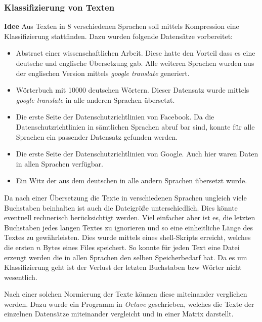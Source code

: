 \documentclass[12pt,german]{article}
\begin{document}
\subsubsection{Klassifizierung von Texten}

\textbf{Idee}
Aus Texten in 8 verschiedenen Sprachen soll mittels Kompression eine Klassifizierung stattfinden. Dazu wurden folgende Datensätze vorbereitet:

\begin{itemize}
	\item Abstract einer wissenschaftlichen Arbeit. Diese hatte den Vorteil dass es eine deutsche und englische Übersetzung gab. Alle weiteren Sprachen wurden aus der englischen Version mittels \textit{google translate} generiert.
	\item Wörterbuch mit 10000 deutschen Wörtern. Dieser Datensatz wurde mittels \textit{google translate} in alle anderen Sprachen übersetzt.
	\item Die erste Seite der Datenschutzrichtlinien von Facebook. Da die Datenschutzrichtlinien in sämtlichen Sprachen abruf bar sind, konnte für alle Sprachen ein passender Datensatz gefunden werden.
	\item Die erste Seite der Datenschutzrichtlinien von Google. Auch hier waren Daten in allen Sprachen verfügbar.
	\item Ein Witz der aus dem deutschen in alle andern Sprachen übersetzt wurde.
\end{itemize}

Da nach einer Übersetzung die Texte in verschiedenen Sprachen ungleich viele Buchstaben beinhalten ist auch die Dateigröße unterschiedlich. Dies könnte eventuell rechnerisch berücksichtigt werden. Viel einfacher aber ist es, die letzten Buchstaben jedes langen Textes zu ignorieren und so eine einheitliche Länge des Textes zu gewährleisten. Dies wurde mittels eines shell-Skripts erreicht, welches die ersten $n$ Bytes eines Files speichert. So konnte für jeden Text eine Datei erzeugt werden die in allen Sprachen den selben Speicherbedarf hat. Da es um Klassifizierung geht ist der Verlust der letzten Buchstaben bzw Wörter nicht wesentlich. 



Nach einer solchen Normierung der Texte können diese miteinander verglichen werden. Dazu wurde ein Programm in \textit{Octave} geschrieben, welches die Texte der einzelnen Datensätze miteinander vergleicht und in einer Matrix darstellt. 
\end{document}
